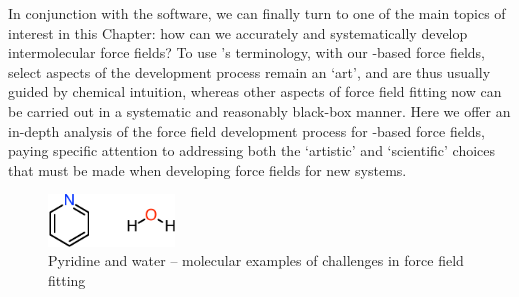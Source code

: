 In conjunction with the \pointer software, we can finally turn to one of the
main topics of interest in this Chapter: how can we accurately and
systematically develop intermolecular force fields? To use
\citeauthor{Halgren1995}'s terminology, with our \sapt-based force fields,
select aspects of the development process remain an `art', and are thus
usually guided by chemical intuition, whereas other aspects of force field
fitting now can be carried out in a systematic and reasonably black-box manner. Here
we offer an in-depth analysis of the force field development process for
\sapt-based force fields, paying
specific attention to addressing both the `artistic' and `scientific' choices
that must be made when developing force fields for new systems. 

\begin{figure}
\centering
\includegraphics[width=0.3\textwidth]{pointer/molecules.pdf}
\caption{Pyridine and water -- molecular examples of challenges in force field fitting}
\label{fig:pointer-molecules}
\end{figure}

